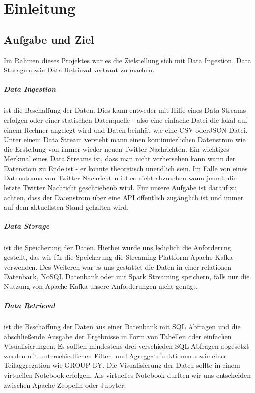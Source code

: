 \chapter{Einleitung}
\label{chap:einleitung}

\section{Aufgabe und Ziel}
Im Rahmen dieses Projektes war es die Zielstellung sich mit Data Ingestion, Data Storage sowie Data Retrieval vertraut zu machen.
\paragraph{Data Ingestion} ist die Beschaffung der Daten.
Dies kann entweder mit Hilfe eines Data Streams erfolgen oder einer statischen Datenquelle - also eine einfache Datei die lokal
auf einem Rechner angelegt wird und Daten beinhät wie \zb{} eine \ac{CSV} oder\ac{JSON} Datei.
Unter einem Data Stream versteht mann einen kontinuierlichen Datenstrom wie \zb{}
die Erstellung von immer wieder neuen Twitter Nachrichten.
Ein wichtiges Merkmal eines Data Streams ist, dass man nicht vorhersehen kann wann der Datenstom zu Ende ist - er könnte theoretisch unendlich sein.
Im Falle von eines Datenstroms von Twitter Nachrichten ist es nicht abzusehen wann jemals die letzte Twitter Nachricht geschriebenb wird.
Für unsere Aufgabe ist darauf zu achten, dass der Datenstrom über eine API öffentlich zugänglich ist und immer auf dem aktuellsten Stand gehalten wird.
\paragraph{Data Storage} ist die Speicherung der Daten.
Hierbei wurde uns lediglich die Anforderung gestellt, das wir für die Speicherung die Streaming Plattform Apache Kafka verwenden.
Des Weiteren war es uns gestattet die Daten in einer relationen Datenbank, NoSQL Datenbank oder mit Spark Streaming speichern,
falls nur die Nutzung von Apache Kafka unsere Anforderungen nicht genügt.
\paragraph{Data Retrieval} ist die Beschaffung der Daten aus einer Datenbank mit SQL Abfragen und die abschließende Ausgabe
der Ergebnisse in Form von Tabellen oder einfachen Visualisierungen.
Es sollten mindestens drei verschieden SQL Abfragen abgesetzt werden mit unterschiedlichen Filter- und Agreggatsfunktionen sowie einer Teilaggregation wie \zb{} GROUP BY.
Die Visualisierung der Daten sollte in einem virtuellen Notebook erfolgen.
Als virtuelles Notebook durften wir uns entscheiden zwischen Apache Zeppelin oder Jupyter.

